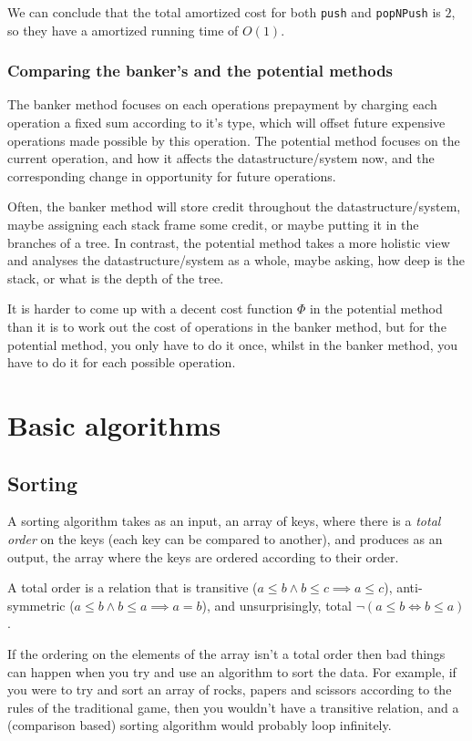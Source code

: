We can conclude that the total amortized cost for both \texttt{push} and
\texttt{popNPush} is $2$, so they have a amortized running time of $O(1)$.

\subsubsection{Comparing the banker's and the potential methods}

The banker method focuses on each operations prepayment by charging each
operation a fixed sum according to it's type, which will offset future expensive
operations made possible by this operation. The potential method focuses on the
current operation, and how it affects the datastructure/system now, and the
corresponding change in opportunity for future operations.

Often, the banker method will store credit throughout the datastructure/system,
maybe assigning each stack frame some credit, or maybe putting it in the
branches of a tree. In contrast, the potential method takes a more holistic view
and analyses the datastructure/system as a whole, maybe asking, how deep is the
stack, or what is the depth of the tree.

It is harder to come up with a decent cost function $\Phi$ in the potential
method than it is to work out the cost of operations in the banker method, but
for the potential method, you only have to do it once, whilst in the banker
method, you have to do it for each possible operation.

\section{Basic algorithms}

\subsection{Sorting}

A sorting algorithm takes as an input, an array of keys, where there is a
\textit{total order} on the keys (each key can be compared to another), and
produces as an output, the array where the keys are ordered according to their
order.

A total order is a relation that is transitive ($a \leq b \wedge b \leq c
\implies a \leq c$), anti-symmetric ($a \leq b \wedge b \leq a \implies a = b$),
and unsurprisingly, total $\neg(a \leq b \Leftrightarrow b \leq a)$.

If the ordering on the elements of the array isn't a total order then bad things
can happen when you try and use an algorithm to sort the data. For example, if
you were to try and sort an array of rocks, papers and scissors according to the
rules of the traditional game, then you wouldn't have a transitive relation, and
a (comparison based) sorting algorithm would probably loop infinitely.


